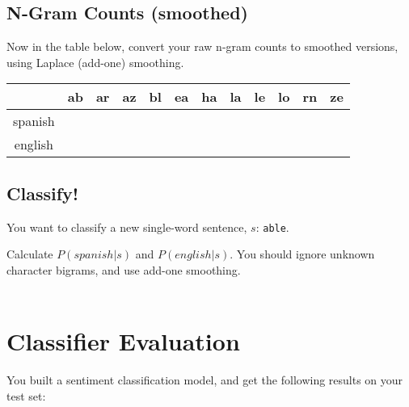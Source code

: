 \documentclass{article}
\begin{document}
\subsection{N-Gram Counts (smoothed)}
Now in the table below, convert your raw n-gram counts to smoothed versions, using Laplace (add-one) smoothing.

\begin{table}[!ht]
\large
    \centering
    \begin{tabular}{|c|c|c|c|c|c|c|c|c|c|c|c|}
    \hline
         &  ab&  ar&  az&  bl&  ea&  ha&  la&  le&  lo&rn &ze\\ \hline
         \multirow{ 2}{*}{spanish}& \hspace{.35in} & \hspace{.35in} & \hspace{.35in} & \hspace{.35in} & \hspace{.35in} & \hspace{.35in} & \hspace{.35in} &\hspace{.35in}  & \hspace{.35in} & \hspace{.35in} & \hspace{.35in} \\ 
         &  &  &  &  &  &  &  &  &  & &\\ \hline
         \multirow{ 2}{*}{english}&  &  &  &  &  &  &  &  &  & &\\ 
         &  &  &  &  &  &  &  &  &  & &\\ 
    \hline
    \end{tabular}
\end{table}
\subsection{Classify!}
You want to classify a new single-word sentence, $s$: \texttt{able}.

Calculate $P(spanish|s)$ and $P(english|s)$. You should ignore unknown character bigrams, and use add-one smoothing.\\\\


\vspace{.5in}


\pagebreak

\section{Classifier Evaluation}
You built a sentiment classification model, and get the following results on your test set:
\end{document}
